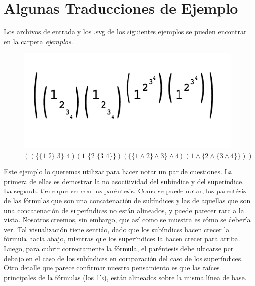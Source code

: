 \newpage

\section{Algunas Traducciones de Ejemplo}

\indent Los archivos de entrada y los .svg de los siguientes ejemplos se pueden encontrar en la carpeta \textit{ejemplos}.\\

\begin{figure}[H]
      \begin{centering}
        \includegraphics{imgs/a}
        \caption{$((\{\{1\_2\}\_3\}\_4)(1\_\{2\_\{3\_4\}\})(\{\{1\wedge2\}\wedge3\}\wedge4)(1\wedge\{2\wedge\{3\wedge4\}\}))$}
       \end{centering}
\end{figure}

\indent Este ejemplo lo queremos utilizar para hacer notar un par de cuestiones. La primera de ellas es demostrar la no asocitividad del subíndice y del superíndice. La segunda tiene que ver con los paréntesis. Como se puede notar, los parentésis de las fórmulas que son una concatenación de subíndices y las de aquellas que son una concatenación de superíndices no están alineados, y puede parecer raro a la vista. Nosotros creemos, sin embargo, que así como se muestra es cómo se debería ver. Tal visualización tiene sentido, dado que los subíndices hacen crecer la fórmula hacia abajo, mientras que los superíndices la hacen crecer para arriba. Luego, para cubrir correctamente la fórmula, el paréntesis debe ubicarse por debajo en el caso de los subíndices en comparación del caso de los superíndices. Otro detalle que parece confirmar nuestro pensamiento es que las raíces principales de la fórmulas (los 1's), están alineados sobre la misma línea de base.\\

